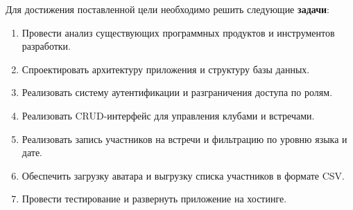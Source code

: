Для достижения поставленной цели необходимо решить следующие \textbf{задачи}:
\begin{enumerate}
    \item Провести анализ существующих программных продуктов и инструментов разработки.
    \item Спроектировать архитектуру приложения и структуру базы данных.
    \item Реализовать систему аутентификации и разграничения доступа по ролям.
    \item Реализовать CRUD-интерфейс для управления клубами и встречами.
    \item Реализовать запись участников на встречи и фильтрацию по уровню языка и дате.
    \item Обеспечить загрузку аватара и выгрузку списка участников в формате CSV.
    \item Провести тестирование и развернуть приложение на хостинге.
\end{enumerate}
